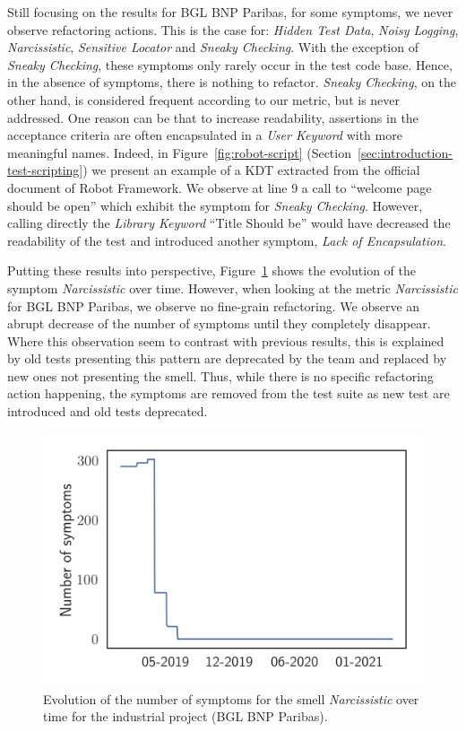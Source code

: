 Still focusing on the results for BGL BNP Paribas, for some symptoms, we never observe refactoring actions. This is the case for: \emph{Hidden Test Data}, \emph{Noisy Logging}, \emph{Narcissistic}, \emph{Sensitive Locator} and \emph{Sneaky Checking}. With the exception of \emph{Sneaky Checking}, these symptoms only rarely occur in the test code base. Hence, in the absence of symptoms, there is nothing to refactor. \emph{Sneaky Checking}, on the other hand, is considered frequent according to our metric, but is never addressed. One reason can be that to increase readability, assertions in the acceptance criteria are often encapsulated in a \emph{User Keyword} with more meaningful names. Indeed, in Figure~\ref{fig:robot-script} (Section~\ref{sec:introduction-test-scripting}) we present an example of a KDT extracted from the official document of Robot Framework. We observe at line 9 a call to ``welcome page should be open'' which exhibit the symptom for \emph{Sneaky Checking}. However, calling directly the \emph{Library Keyword} ``Title Should be'' would have decreased the readability of the test and introduced another symptom, \emph{Lack of Encapsulation}.

Putting these results into perspective, Figure~\ref{fig:evolution-bgl-narcissistic} shows the evolution of the symptom \emph{Narcissistic} over time. However, when looking at the metric \emph{Narcissistic} for BGL BNP Paribas, we observe no fine-grain refactoring. We observe an abrupt decrease of the number of symptoms until they completely disappear. Where this observation seem to contrast with previous results, this is explained by old tests presenting this pattern are deprecated by the team and replaced by new ones not presenting the smell. Thus, while there is no specific refactoring action happening, the symptoms are removed from the test suite as new test are introduced and old tests deprecated. 

\begin{figure}
\centering
\includegraphics[width=0.5\linewidth]{figures/smells/smell-raw-evolution-bgl-narcissistic.png}
\caption{Evolution of the number of symptoms for the smell \emph{Narcissistic} over time for the industrial project (BGL BNP Paribas).}  
\label{fig:evolution-bgl-narcissistic}
\end{figure} 


